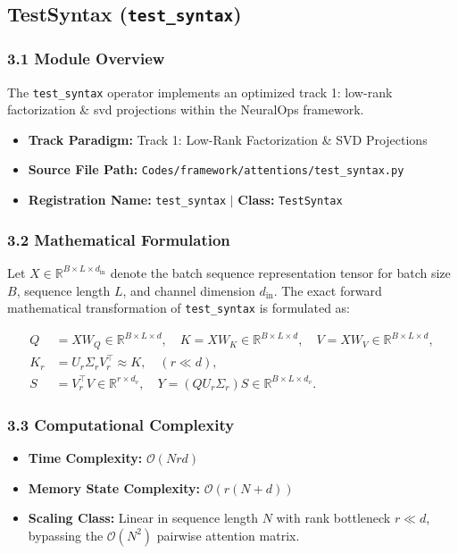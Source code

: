 \subsection{TestSyntax (\texttt{test\_syntax})}
\label{sec:app_module_test\_syntax}

\subsubsection*{3.1 Module Overview}
The \texttt{test\_syntax} operator implements an optimized track 1: low-rank factorization \& svd projections within the NeuralOps framework.
\begin{itemize}
    \item \textbf{Track Paradigm:} Track 1: Low-Rank Factorization & SVD Projections
    \item \textbf{Source File Path:} \texttt{Codes/framework/attentions/test\_syntax.py}
    \item \textbf{Registration Name:} \texttt{test\_syntax} $\mid$ \textbf{Class:} \texttt{TestSyntax}
\end{itemize}

\subsubsection*{3.2 Mathematical Formulation}
Let $X \in \mathbb{R}^{B \times L \times d_{\text{in}}}$ denote the batch sequence representation tensor for batch size $B$, sequence length $L$, and channel dimension $d_{\text{in}}$. The exact forward mathematical transformation of \texttt{test\_syntax} is formulated as:

\begin{align}
Q &= X W_Q \in \mathbb{R}^{B \times L \times d}, \quad K = X W_K \in \mathbb{R}^{B \times L \times d}, \quad V = X W_V \in \mathbb{R}^{B \times L \times d}, \\
K_r &= U_r \Sigma_r V_r^\top \approx K, \quad (r \ll d), \\
S &= V_r^\top V \in \mathbb{R}^{r \times d_v}, \quad Y = (Q U_r \Sigma_r) S \in \mathbb{R}^{B \times L \times d_v}.
\end{align}


\subsubsection*{3.3 Computational Complexity}
\begin{itemize}
    \item \textbf{Time Complexity:} $\mathcal{O}(N r d)$
    \item \textbf{Memory State Complexity:} $\mathcal{O}(r(N + d))$
    \item \textbf{Scaling Class:} Linear in sequence length $N$ with rank bottleneck $r \ll d$, bypassing the $\mathcal{O}(N^2)$ pairwise attention matrix.
\end{itemize}

